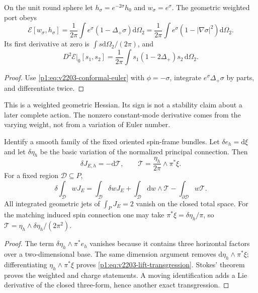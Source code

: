 \documentclass[11pt]{article}
\begin{document}
\begin{corollary}
\label{p1:cor:v2203-conformal-weight-leaf}
On the unit round sphere let \(h_\sigma=e^{-2\sigma}h_0\) and
\(w_\sigma=e^\sigma\). The geometric weighted port obeys
\[
 \mathcal E[w_\sigma,h_\sigma]
 =\frac1{2\pi}\int e^\sigma(1-\Delta_+\sigma)\mathrm d\Omega_2
 =\frac1{2\pi}\int e^\sigma(1-|\nabla\sigma|^2)\mathrm d\Omega_2.
\]
Its first derivative at zero is \(\int s\mathrm d\Omega_2/(2\pi)\), and
\[
 D^2\mathcal E|_0[s_1,s_2]
 =\frac1{2\pi}\int s_1(1-2\Delta_+)s_2\,\mathrm d\Omega_2.
\]
\end{corollary}
\begin{proof}
Use \eqref{p1:eq:v2203-conformal-euler} with \(\phi=-\sigma\), integrate
\(e^\sigma\Delta_+\sigma\) by parts, and differentiate twice.
\end{proof}
This is a weighted geometric Hessian. Its sign is not a stability claim
about a later complete action. The nonzero constant-mode derivative comes
from the varying weight, not from a variation of Euler number.

\begin{theorem}
\label{p1:thm:v2203-lift-transgression}
Identify a smooth family of the fixed oriented spin-frame bundles. Let
\(\delta e_h=\mathrm d\xi\) and let \(\delta\eta_h\) be the basic
variation of the normalized principal connection. Then
\begin{equation}
\label{p1:eq:v2203-lift-transgression}
 \delta J_{E,h}=-\mathrm d\mathcal T,
 \qquad \mathcal T=\frac{\eta_h}{2\pi}\wedge\pi^*\xi.
\end{equation}
For a fixed region \(\mathcal D\subseteq P\),
\[
 \delta\int_{\mathcal D}wJ_E
 =\int_{\mathcal D}\delta wJ_E
 +\int_{\mathcal D}\mathrm dw\wedge\mathcal T
 -\int_{\partial\mathcal D}w\mathcal T.
\]
All integrated geometric jets of \(\int_PJ_E=2\) vanish on the closed
total space. For the matching induced spin connection one may take
\(\pi^*\xi=\delta\eta_h/\pi\), so
\(\mathcal T=\eta_h\wedge\delta\eta_h/(2\pi^2)\).
\end{theorem}
\begin{proof}
The term \(\delta\eta_h\wedge\pi^*e_h\) vanishes because it contains
three horizontal factors over a two-dimensional base. The same dimension
argument removes \(\mathrm d\eta_h\wedge\pi^*\xi\); differentiating
\(\eta_h\wedge\pi^*\xi\) proves
\eqref{p1:eq:v2203-lift-transgression}. Stokes' theorem proves the weighted
and charge statements. A moving identification adds a Lie derivative of
the closed three-form, hence another exact transgression.
\end{proof}
\end{document}
